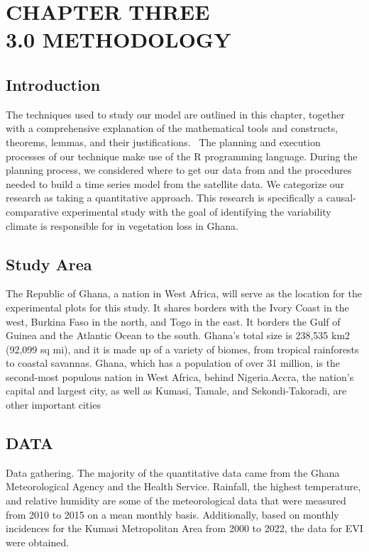 
\chapter{CHAPTER THREE\\3.0 METHODOLOGY} %

\label{Chapter3} %


\section{Introduction}
The techniques used to study our model are outlined in this chapter, together with a comprehensive explanation of the mathematical tools and constructs, theorems, lemmas, and their justifications.  The planning and execution processes of our technique make use of the R programming language. During the planning process, we considered where to get our data from and the procedures needed to build a time series model from the satellite data. We categorize our research as taking a quantitative approach. This research is specifically a causal-comparative experimental study with the goal of identifying the variability climate is responsible for in vegetation loss in Ghana.
 \section{Study Area}
 The Republic of Ghana, a nation in West Africa, will serve as the location for the experimental plots for this study. It shares borders with the Ivory Coast in the west, Burkina Faso in the north, and Togo in the east. It borders the Gulf of Guinea and the Atlantic Ocean to the south. Ghana's total size is 238,535 km2 (92,099 sq mi), and it is made up of a variety of biomes, from tropical rainforests to coastal savannas. Ghana, which has a population of over 31 million, is the second-most populous nation in West Africa, behind Nigeria.Accra, the nation's capital and largest city, as well as Kumasi, Tamale, and Sekondi-Takoradi, are other important cities

\section{DATA }
Data gathering. The majority of the quantitative data came from the Ghana Meteorological Agency and the Health Service. Rainfall, the highest temperature, and relative humidity are some of the meteorological data that were measured from 2010 to 2015 on a mean monthly basis. Additionally, based on monthly incidences for the Kumasi Metropolitan Area from 2000 to 2022, the data for EVI were obtained.

